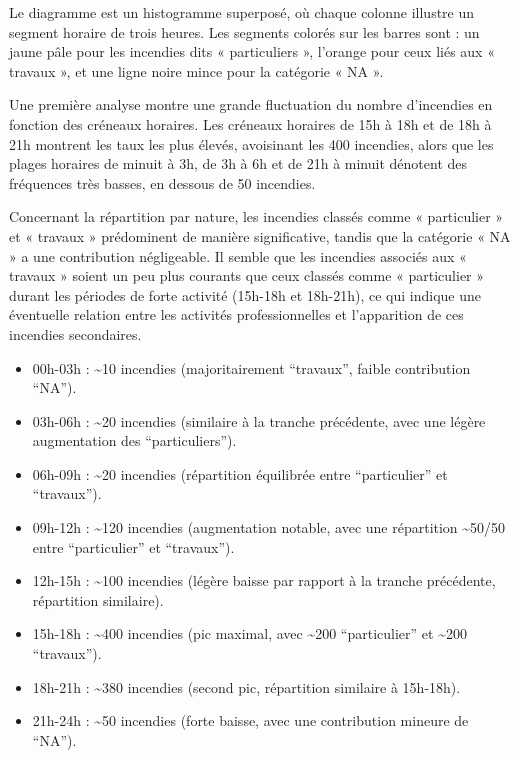 \documentclass[
]{article}
\providecommand{\tightlist}{%
  \setlength{\itemsep}{0pt}\setlength{\parskip}{0pt}}
\begin{document}
Le diagramme est un histogramme superposé, où chaque colonne illustre un
segment horaire de trois heures. Les segments colorés sur les barres
sont : un jaune pâle pour les incendies dits « particuliers », l'orange
pour ceux liés aux « travaux », et une ligne noire mince pour la
catégorie « NA ».

Une première analyse montre une grande fluctuation du nombre d'incendies
en fonction des créneaux horaires. Les créneaux horaires de 15h à 18h et
de 18h à 21h montrent les taux les plus élevés, avoisinant les 400
incendies, alors que les plages horaires de minuit à 3h, de 3h à 6h et
de 21h à minuit dénotent des fréquences très basses, en dessous de 50
incendies.

Concernant la répartition par nature, les incendies classés comme «
particulier » et « travaux » prédominent de manière significative,
tandis que la catégorie « NA » a une contribution négligeable. Il semble
que les incendies associés aux « travaux » soient un peu plus courants
que ceux classés comme « particulier » durant les périodes de forte
activité (15h-18h et 18h-21h), ce qui indique une éventuelle relation
entre les activités professionnelles et l'apparition de ces incendies
secondaires.

\begin{itemize}
\tightlist
\item
  00h-03h : \textasciitilde10 incendies (majoritairement ``travaux'',
  faible contribution ``NA'').
\item
  03h-06h : \textasciitilde20 incendies (similaire à la tranche
  précédente, avec une légère augmentation des ``particuliers'').
\item
  06h-09h : \textasciitilde20 incendies (répartition équilibrée entre
  ``particulier'' et ``travaux'').
\item
  09h-12h : \textasciitilde120 incendies (augmentation notable, avec une
  répartition \textasciitilde50/50 entre ``particulier'' et
  ``travaux'').
\item
  12h-15h : \textasciitilde100 incendies (légère baisse par rapport à la
  tranche précédente, répartition similaire).
\item
  15h-18h : \textasciitilde400 incendies (pic maximal, avec
  \textasciitilde200 ``particulier'' et \textasciitilde200 ``travaux'').
\item
  18h-21h : \textasciitilde380 incendies (second pic, répartition
  similaire à 15h-18h).
\item
  21h-24h : \textasciitilde50 incendies (forte baisse, avec une
  contribution mineure de ``NA'').
\end{itemize}
\end{document}

